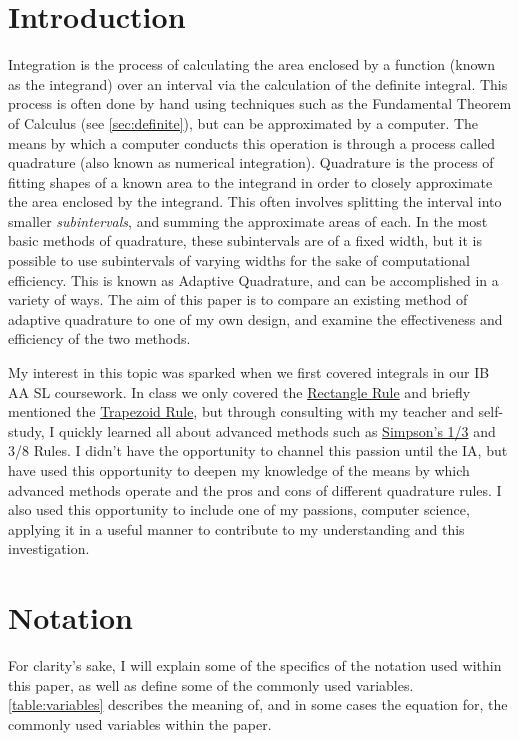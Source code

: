 \documentclass{paper}
\begin{document}
\insertTitlePage
{}
\tableofcontents
\thispagestyle{frontorback}
\newpage
\setcounter{page}{1}
\justifying

\section{Introduction}
\label{sec:intro}
Integration is the process of calculating the area enclosed by a function (known as the integrand) over an interval via the calculation of the definite integral.
This process is often done by hand using techniques such as the Fundamental Theorem of Calculus (see \cref{sec:definite}), but can be approximated by a computer.
The means by which a computer conducts this operation is through a process called quadrature (also known as numerical integration).
Quadrature is the process of fitting shapes of a known area to the integrand in order to closely approximate the area enclosed by the integrand.
This often involves splitting the interval into smaller \textit{subintervals}, and summing the approximate areas of each.
In the most basic methods of quadrature, these subintervals are of a fixed width, but it is possible to use subintervals of varying widths for the sake of computational efficiency.
This is known as Adaptive Quadrature, and can be accomplished in a variety of ways.
The aim of this paper is to compare an existing method of adaptive quadrature to one of my own design, and examine the effectiveness and efficiency of the two methods.

My interest in this topic was sparked when we first covered integrals in our IB AA SL coursework.
In class we only covered the \hyperref[sec:rect_rule]{Rectangle Rule} and briefly mentioned the \hyperref[sec:trap_rule]{Trapezoid Rule}, but through consulting with my teacher and self-study, I quickly learned all about advanced methods such as \hyperref[sec:smps_rule]{Simpson's 1/3} and 3/8 Rules.
I didn't have the opportunity to channel this passion until the IA, but have used this opportunity to deepen my knowledge of the means by which advanced methods operate and the pros and cons of different quadrature rules.
I also used this opportunity to include one of my passions, computer science, applying it in a useful manner to contribute to my understanding and this investigation.
%
\section{Notation}
\label{sec:notation}
For clarity's sake, I will explain some of the specifics of the notation used within this paper, as well as define some of the commonly used variables.
\cref{table:variables} describes the meaning of, and in some cases the equation for, the commonly used variables within the paper.
%
\end{document}
